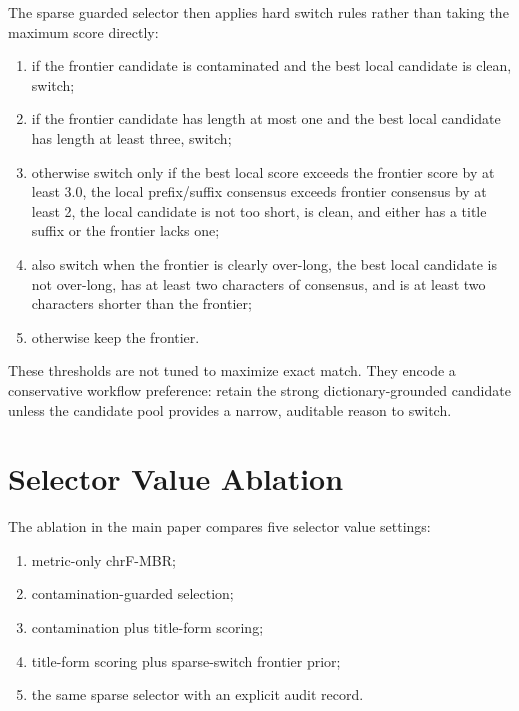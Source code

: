 \documentclass{article}
\begin{document}
The sparse guarded selector then applies hard switch rules rather than taking the maximum score directly:
\begin{enumerate}
    \item if the frontier candidate is contaminated and the best local candidate is clean, switch;
    \item if the frontier candidate has length at most one and the best local candidate has length at least three, switch;
    \item otherwise switch only if the best local score exceeds the frontier score by at least 3.0, the local prefix/suffix consensus exceeds frontier consensus by at least 2, the local candidate is not too short, is clean, and either has a title suffix or the frontier lacks one;
    \item also switch when the frontier is clearly over-long, the best local candidate is not over-long, has at least two characters of consensus, and is at least two characters shorter than the frontier;
    \item otherwise keep the frontier.
\end{enumerate}

These thresholds are not tuned to maximize exact match. They encode a conservative workflow preference: retain the strong dictionary-grounded candidate unless the candidate pool provides a narrow, auditable reason to switch.

\section{Selector Value Ablation}

The ablation in the main paper compares five selector value settings:
\begin{enumerate}
    \item metric-only chrF-MBR;
    \item contamination-guarded selection;
    \item contamination plus title-form scoring;
    \item title-form scoring plus sparse-switch frontier prior;
    \item the same sparse selector with an explicit audit record.
\end{enumerate}
\end{document}
